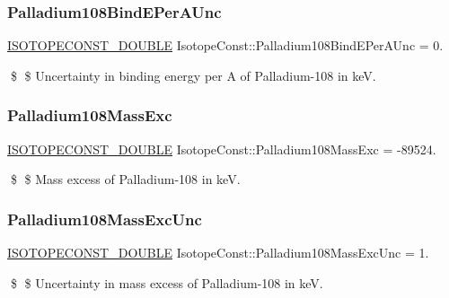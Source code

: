 \subsubsection{\texorpdfstring{Palladium108\+Bind\+E\+Per\+A\+Unc}{Palladium108BindEPerAUnc}}
{\footnotesize\ttfamily \mbox{\hyperlink{group___isotope_const-_macros_ga8f45a7272ce02c0b4c65c44636ed719a}{I\+S\+O\+T\+O\+P\+E\+C\+O\+N\+S\+T\+\_\+\+D\+O\+U\+B\+LE}} Isotope\+Const\+::\+Palladium108\+Bind\+E\+Per\+A\+Unc = 0.}

\$ \$ Uncertainty in binding energy per A of Palladium-\/108 in keV. \mbox{\label{group___isotope_const-_palladium-_pd108_gaf3197bfd3aa5b496fa66a2fc3f87e04f}} 
\subsubsection{\texorpdfstring{Palladium108\+Mass\+Exc}{Palladium108MassExc}}
{\footnotesize\ttfamily \mbox{\hyperlink{group___isotope_const-_macros_ga8f45a7272ce02c0b4c65c44636ed719a}{I\+S\+O\+T\+O\+P\+E\+C\+O\+N\+S\+T\+\_\+\+D\+O\+U\+B\+LE}} Isotope\+Const\+::\+Palladium108\+Mass\+Exc = -\/89524.}

\$ \$ Mass excess of Palladium-\/108 in keV. \mbox{\label{group___isotope_const-_palladium-_pd108_ga9330b621dcc70ff15dc0342fa4af00ee}} 
\subsubsection{\texorpdfstring{Palladium108\+Mass\+Exc\+Unc}{Palladium108MassExcUnc}}
{\footnotesize\ttfamily \mbox{\hyperlink{group___isotope_const-_macros_ga8f45a7272ce02c0b4c65c44636ed719a}{I\+S\+O\+T\+O\+P\+E\+C\+O\+N\+S\+T\+\_\+\+D\+O\+U\+B\+LE}} Isotope\+Const\+::\+Palladium108\+Mass\+Exc\+Unc = 1.}

\$ \$ Uncertainty in mass excess of Palladium-\/108 in keV. \mbox{\label{group___isotope_const-_palladium-_pd108_ga0e9a31378d76be4f09b95a631b1e53ab}} 
